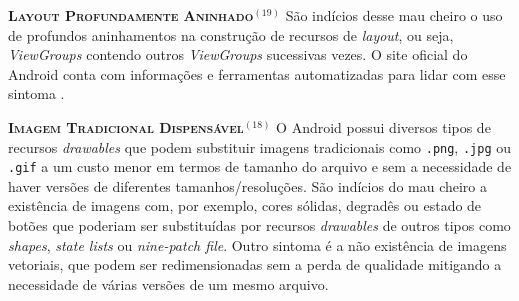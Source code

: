 

  \noindent
  \textbf{\textsc{{\small Layout Profundamente Aninhado}}}$^{(19)}$
      São indícios desse mau cheiro o uso de profundos aninhamentos na construção de recursos de \textit{layout}, ou seja, \textit{ViewGroups} contendo outros \textit{ViewGroups} sucessivas vezes. O site oficial do Android conta com informações e ferramentas automatizadas para lidar com esse sintoma \cite{OptmizingViewHierarchies}.


  \noindent
  \textbf{\textsc{{\small Imagem Tradicional Dispensável}}}$^{(18)}$
      O Android possui diversos tipos de recursos \textit{drawables} que podem substituir imagens tradicionais como \texttt{.png}, \texttt{.jpg} ou \texttt{.gif} a um custo menor em termos de tamanho do arquivo e sem a necessidade de haver versões de diferentes tamanhos/resoluções. São indícios do mau cheiro a existência de imagens com, por exemplo, cores sólidas, degradês ou estado de botões que poderiam ser substituídas por recursos \textit{drawables} de outros tipos como \textit{shapes}, \textit{state lists} ou \textit{nine-patch file}. Outro sintoma é a não existência de imagens vetoriais, que podem ser redimensionadas sem a perda de qualidade mitigando a necessidade de várias versões de um mesmo arquivo.



